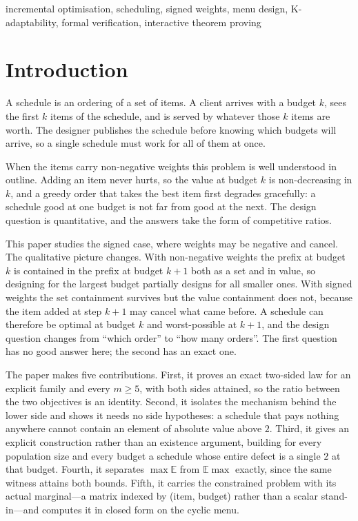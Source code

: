 \begin{IEEEkeywords}
incremental optimisation, scheduling, signed weights, menu design, K-adaptability,
formal verification, interactive theorem proving
\end{IEEEkeywords}

\section{Introduction}

A schedule is an ordering of a set of items. A client arrives with a budget $k$, sees the
first $k$ items of the schedule, and is served by whatever those $k$ items are worth. The
designer publishes the schedule before knowing which budgets will arrive, so a single
schedule must work for all of them at once.

When the items carry non-negative weights this problem is well understood in outline. Adding
an item never hurts, so the value at budget $k$ is non-decreasing in $k$, and a greedy order
that takes the best item first degrades gracefully: a schedule good at one budget is not far
from good at the next. The design question is quantitative, and the answers take the form of
competitive ratios.

This paper studies the signed case, where weights may be negative and cancel. The qualitative
picture changes. With non-negative weights the prefix at budget $k$ is contained in the
prefix at budget $k+1$ both as a set and in value, so designing for the largest budget
partially designs for all smaller ones. With signed weights the set containment survives but
the value containment does not, because the item added at step $k+1$ may cancel what came
before. A schedule can therefore be optimal at budget $k$ and worst-possible at $k+1$, and
the design question changes from ``which order'' to ``how many orders''. The first question
has no good answer here; the second has an exact one.

The paper makes five contributions. First, it proves an exact two-sided law for an explicit
family and every $m\ge5$, with both sides attained, so the ratio between the two objectives
is an identity. Second, it isolates the mechanism behind the lower side and shows it needs no
side hypotheses: a schedule that pays nothing anywhere cannot contain an element of absolute
value above $2$. Third, it gives an explicit construction rather than an existence argument,
building for every population size and every budget a schedule whose entire defect is a
single $2$ at that budget. Fourth, it separates $\max\mathbb{E}$ from $\mathbb{E}\max$
exactly, since the same witness attains both bounds. Fifth, it carries the constrained
problem with its actual marginal---a matrix indexed by (item, budget) rather than a scalar
stand-in---and computes it in closed form on the cyclic menu.

